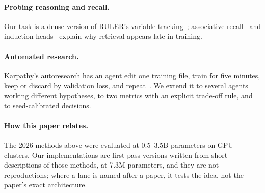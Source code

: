 \paragraph{Probing reasoning and recall.} Our task is a dense version of RULER's variable
tracking~\citep{hsieh2024ruler}; associative recall~\citep{arora2024zoology} and induction
heads~\citep{olsson2022context} explain why retrieval appears late in training.

\paragraph{Automated research.} Karpathy's autoresearch has an agent edit one training file, train for
five minutes, keep or discard by validation loss, and repeat~\citep{karpathy2026autoresearch}. We extend
it to several agents working different hypotheses, to two metrics with an explicit trade-off rule, and
to seed-calibrated decisions.

\paragraph{How this paper relates.} The 2026 methods above were evaluated at 0.5--3.5B parameters on
GPU clusters. Our implementations are first-pass versions written from short descriptions of those
methods, at 7.3M parameters, and they are not reproductions; where a lane is named after a paper, it
tests the idea, not the paper's exact architecture.
